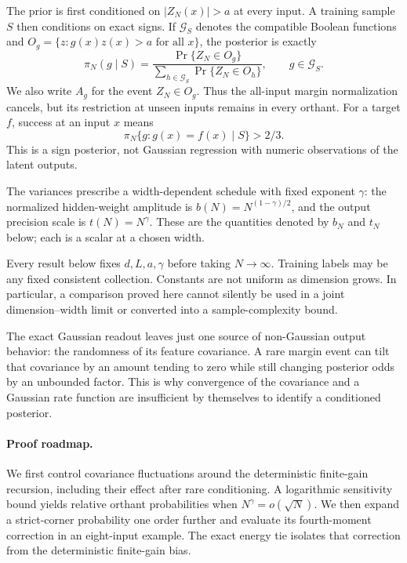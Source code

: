 \documentclass[11pt]{article}
\theoremstyle{remark}
\begin{document}
The prior is first conditioned on $|Z_N(x)|>a$ at every input.
A training sample $S$ then conditions on exact signs. If
$\mathcal G_S$ denotes the compatible Boolean functions and
$O_g=\{z:g(x)z(x)>a\text{ for all }x\}$, the posterior is exactly
\[
 \pi_N(g\mid S)=
 \frac{\Pr\{Z_N\in O_g\}}
      {\sum_{h\in\mathcal G_S}\Pr\{Z_N\in O_h\}},
 \qquad g\in\mathcal G_S.
\]
We also write $A_g$ for the event $Z_N\in O_g$.
Thus the all-input margin normalization cancels, but its restriction
at unseen inputs remains in every orthant. For a target $f$, success
at an input $x$ means
\[
 \pi_N\{g:g(x)=f(x)\mid S\}>2/3.
\]
This is a sign posterior, not Gaussian regression with numeric
observations of the latent outputs.

The variances prescribe a width-dependent schedule with fixed exponent
$\gamma$: the normalized hidden-weight amplitude is
$b(N)=N^{(1-\gamma)/2}$, and the output precision scale is
$t(N)=N^\gamma$. These are the quantities denoted by $b_N$ and $t_N$
below; each is a scalar at a chosen width.

Every result below fixes $d,L,a,\gamma$ before taking $N\to\infty$.
Training labels may be any fixed consistent collection. Constants
are not uniform as dimension grows. In particular, a comparison
proved here cannot silently be used in a joint dimension--width
limit or converted into a sample-complexity bound.

The exact Gaussian readout leaves just one source of non-Gaussian
output behavior: the randomness of its feature covariance. A rare
margin event can tilt that covariance by an amount tending to zero
while still changing posterior odds by an unbounded factor. This
is why convergence of the covariance and a Gaussian rate function
are insufficient by themselves to identify a conditioned posterior.

\paragraph{Proof roadmap.}
We first control covariance fluctuations around the deterministic
finite-gain recursion, including their effect after rare conditioning.
A logarithmic sensitivity bound yields relative orthant probabilities
when $N^\gamma=o(\sqrt N)$. We then expand a strict-corner probability
one order further and evaluate its fourth-moment correction in an
eight-input example. The exact energy tie isolates that correction
from the deterministic finite-gain bias.



\end{document}
